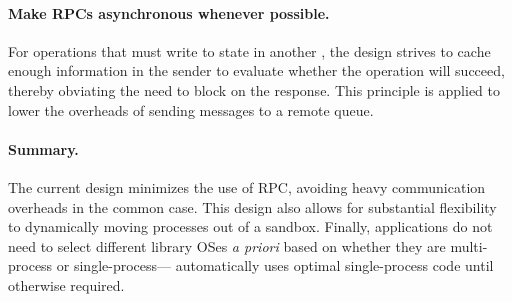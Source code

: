 \paragraph{Make RPCs asynchronous whenever possible.} 
For operations that must write to state in another \picoproc{}, 
the \sysname{} design strives to cache enough information in the sender 
to evaluate whether the operation will succeed, thereby obviating the 
need to block on the response.  This principle is applied to lower the overheads
of sending messages to a remote queue.




\paragraph{Summary.}
The current \sysname{} design minimizes the use of RPC,
avoiding heavy communication overheads in the common case.
This design also allows for substantial flexibility to dynamically moving processes out of
a sandbox.  Finally, applications do not need to select different 
library OSes {\em a priori} based on whether they are multi-process or single-process---\sysname{}
automatically uses optimal single-process code until otherwise required.
